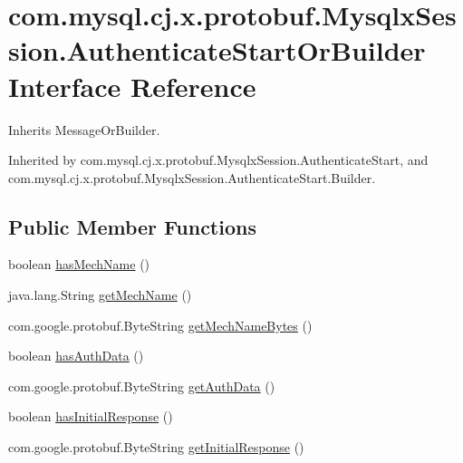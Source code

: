 \hypertarget{interfacecom_1_1mysql_1_1cj_1_1x_1_1protobuf_1_1_mysqlx_session_1_1_authenticate_start_or_builder}{}\section{com.\+mysql.\+cj.\+x.\+protobuf.\+Mysqlx\+Session.\+Authenticate\+Start\+Or\+Builder Interface Reference}
\label{interfacecom_1_1mysql_1_1cj_1_1x_1_1protobuf_1_1_mysqlx_session_1_1_authenticate_start_or_builder}


Inherits Message\+Or\+Builder.



Inherited by com.\+mysql.\+cj.\+x.\+protobuf.\+Mysqlx\+Session.\+Authenticate\+Start, and com.\+mysql.\+cj.\+x.\+protobuf.\+Mysqlx\+Session.\+Authenticate\+Start.\+Builder.

\subsection*{Public Member Functions}
\begin{DoxyCompactItemize}
\item 
boolean \mbox{\hyperlink{interfacecom_1_1mysql_1_1cj_1_1x_1_1protobuf_1_1_mysqlx_session_1_1_authenticate_start_or_builder_a6885f3f6e61f2efd84bc1b8ee567344d}{has\+Mech\+Name}} ()
\item 
java.\+lang.\+String \mbox{\hyperlink{interfacecom_1_1mysql_1_1cj_1_1x_1_1protobuf_1_1_mysqlx_session_1_1_authenticate_start_or_builder_a3414edee7b54d994c7fbae93969030e9}{get\+Mech\+Name}} ()
\item 
com.\+google.\+protobuf.\+Byte\+String \mbox{\hyperlink{interfacecom_1_1mysql_1_1cj_1_1x_1_1protobuf_1_1_mysqlx_session_1_1_authenticate_start_or_builder_a34127e54e895aa777b49a8f6de907fb0}{get\+Mech\+Name\+Bytes}} ()
\item 
boolean \mbox{\hyperlink{interfacecom_1_1mysql_1_1cj_1_1x_1_1protobuf_1_1_mysqlx_session_1_1_authenticate_start_or_builder_ae7c785c89e4ebc809673c1f4c1230083}{has\+Auth\+Data}} ()
\item 
com.\+google.\+protobuf.\+Byte\+String \mbox{\hyperlink{interfacecom_1_1mysql_1_1cj_1_1x_1_1protobuf_1_1_mysqlx_session_1_1_authenticate_start_or_builder_acb77f3ad0d94a43a5de20505ac7b7bbe}{get\+Auth\+Data}} ()
\item 
boolean \mbox{\hyperlink{interfacecom_1_1mysql_1_1cj_1_1x_1_1protobuf_1_1_mysqlx_session_1_1_authenticate_start_or_builder_a4b86c20df41bdde29d47f67adfffa3f0}{has\+Initial\+Response}} ()
\item 
com.\+google.\+protobuf.\+Byte\+String \mbox{\hyperlink{interfacecom_1_1mysql_1_1cj_1_1x_1_1protobuf_1_1_mysqlx_session_1_1_authenticate_start_or_builder_adc96c0b736b7a45b4105f479c5e1c551}{get\+Initial\+Response}} ()
\end{DoxyCompactItemize}


